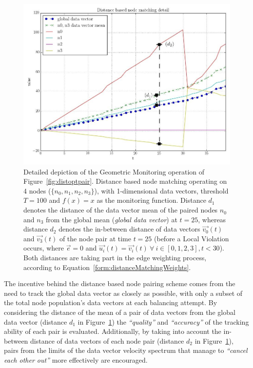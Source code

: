\begin{figure}
        \centering
		\includegraphics[scale=0.35]{img/distoptpair_example_detail_edited.jpeg}
        \caption{Detailed depiction of the Geometric Monitoring operation of Figure~\ref{fig:distoptpair}. Distance based node matching operating on 4 nodes ($\{n_0, n_1, n_2, n_3\}$), with 1-dimensional data vectors, threshold $T=100$ and $f(x)=x$ as the monitoring function. Distance $d_1$ denotes the distance of the data vector mean of the paired nodes $n_0$ and $n_3$ from the global mean (\emph{global data vector}) at $t=25$, whereas distance $d_2$ denotes the in-between distance of data vectors $\vec{v_0}(t)$ and $\vec{v_3}(t)$ of the node pair at time $t=25$ (before a Local Violation occurs, where $\vec{e}=0$ and $\vec{u_i}(t)=\vec{v_i}(t)\ \forall\ i\in[0,1,2,3], t<30$). Both distances are taking part in the edge weighting process, according to Equation~\ref{form:distanceMatchingWeights}.} \label{fig:distoptpairdetailed}
\end{figure}%

The incentive behind the distance based node pairing scheme comes from the need to track the global data vector as closely as possible, with only a subset of the total node population's data vectors at each balancing attempt. By considering the distance of the mean of a pair of data vectors from the global data vector (distance $d_1$ in Figure~\ref{fig:distoptpairdetailed}) the \emph{``quality''} and \emph{``accuracy''} of the tracking ability of each pair is evaluated. Additionally, by taking into account the in-between distance of data vectors of each node pair (distance $d_2$ in Figure~\ref{fig:distoptpairdetailed}), pairs from the limits of the data vector velocity spectrum that manage to \emph{``cancel each other out''} more effectively are encouraged.

